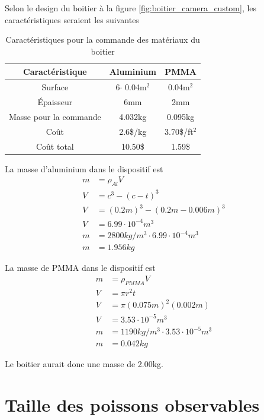 Selon le design du boitier à la figure \ref{fig:boitier_camera_custom}, les caractéristiques seraient les suivantes 

\begin{table}[!htb]
\footnotesize
\centering
    \begin{tabular}{|c|c|c|}
    \hline
    Caractéristique & Aluminium & PMMA\\
    \hline\hline
    Surface & 6$\cdot$ 0.04m$^2$ & 0.04m$^2$\\
    Épaisseur & 6mm & 2mm\\
    Masse pour la commande & 4.032kg & 0.095kg\\
    Coût & 2.6\$/kg & 3.70\$/ft$^2$ \\
    \hline
    Coût total & 10.50\$ & 1.59\$ \\
    \hline
    \end{tabular}
\caption{Caractéristiques pour la commande des matériaux du boitier \cite{PMMA_cout} \cite{Aluminium_cout}}
\label{t:commande_boitier}
\end{table}

La masse d'aluminium dans le dispositif est
\begin{align}
    m &= \rho_{Al} V\\
    V &= c^3 - (c-t)^3\\
    V &= (0.2m)^3 - (0.2m - 0.006m)^3\\
    V &= 6.99 \cdot 10^{-4} m^3\\
    m &= 2800 kg/m^3 \cdot 6.99 \cdot 10^{-4}m^3\\
    m &= 1.956 kg
\end{align}

La masse de PMMA dans le dispositif est
\begin{align}
    m &= \rho_{PMMA} V\\
    V &= \pi r^2 t\\
    V &= \pi (0.075m)^2 (0.002m)\\
    V &= 3.53 \cdot 10^{-5} m^3\\
    m &= 1190 kg/m^3 \cdot 3.53 \cdot 10^{-5} m^3\\
    m &= 0.042 kg
\end{align}

Le boitier aurait donc une masse de 2.00kg.

\section{Taille des poissons observables}
\label{annexe:taille_poissons}

